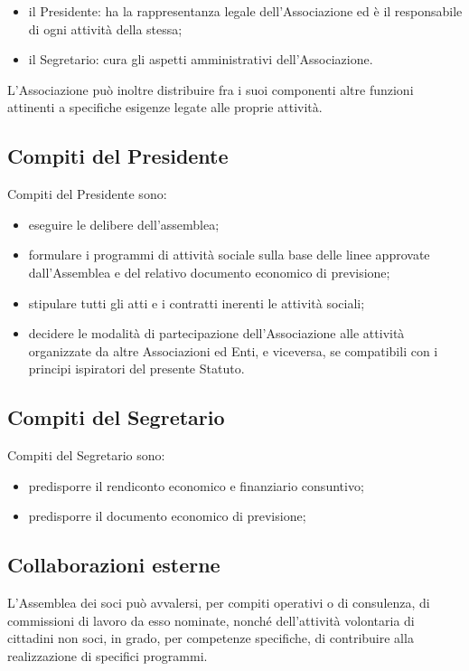 \documentclass[a4paper,11pt,oneside]{article}
\begin{document}
\begin{itemize}
 \item  il Presidente: ha la rappresentanza legale dell'Associazione ed è il responsabile di ogni attività della stessa;
 \item  il Segretario: cura gli aspetti amministrativi dell'Associazione. 
\end{itemize}

L'Associazione può inoltre distribuire fra i suoi componenti altre funzioni attinenti a specifiche esigenze legate alle proprie attività.

\subsection{Compiti del Presidente}
Compiti del Presidente sono:

\begin{itemize}
 \item  eseguire le delibere dell'assemblea;
 \item  formulare i programmi di attività sociale sulla base delle linee approvate dall'Assemblea e del relativo documento economico di previsione; 
 \item  stipulare tutti gli atti e i contratti inerenti le attività sociali;
 \item  decidere le modalità di partecipazione dell'Associazione alle attività organizzate da altre Associazioni ed Enti, e viceversa, se compatibili con i principi ispiratori del presente Statuto. 
\end{itemize}

\subsection{Compiti del Segretario}
Compiti del Segretario sono:

\begin{itemize}
 \item  predisporre il rendiconto economico e finanziario consuntivo;
 \item  predisporre il documento economico di previsione;
\end{itemize}

\subsection{Collaborazioni esterne}
L'Assemblea dei soci può avvalersi, per compiti operativi o di consulenza, di commissioni di lavoro da esso nominate, nonché dell'attività volontaria di cittadini non soci, in grado, per competenze specifiche, di contribuire alla realizzazione di specifici programmi.
\end{document}
